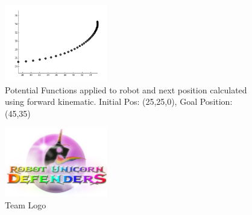 \documentclass[conference,12pt]{IEEEtran}
\begin{document}
\begin{figure}[htp]
\begin{center}
\leavevmode
\includegraphics[width=0.4\textwidth] {PF-curve.png}
\end{center}
\caption{Potential Functions applied to robot and next position calculated using forward kinematic. Initial Pos: (25,25,0), Goal Position: (45,35)}
\label{fig:PF_Path2}
\end{figure}

\pagebreak

\begin{figure}[htp]
\begin{center}
\leavevmode
\includegraphics[width=0.4\textwidth] {logo.jpg}
\end{center}
\caption{Team Logo}
\label{fig:logo}
\end{figure}
\end{document}
